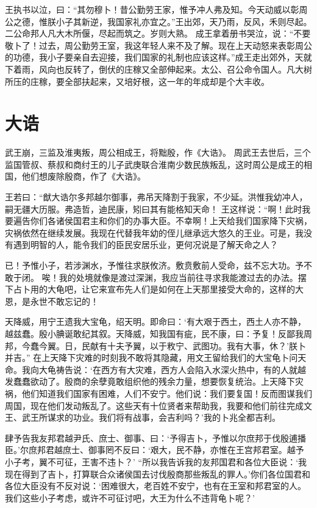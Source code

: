 \documentclass[12pt,UTF8]{ctexbook}
\begin{document}
王执书以泣，曰：“其勿穆卜！昔公勤劳王家，惟予冲人弗及知。今天动威以彰周公之德，惟朕小子其新逆，我国家礼亦宜之。”王出郊，天乃雨，反风，禾则尽起。二公命邦人凡大木所偃，尽起而筑之。岁则大熟。
成王拿着册书哭泣，说：“不要敬卜了！过去，周公勤劳王室，我这年轻人来不及了解。现在上天动怒来表彰周公的功德，我小子要亲自去迎接，我们国家的礼制也应该这样。”成王走出郊外，天就下着雨，风向也反转了，倒伏的庄稼又全部伸起来。太公、召公命令国人。凡大树所压的庄稼，要全部扶起来，又培好根，这一年的年成却是个大丰收。

\chapter{大诰}

武王崩，三监及淮夷叛，周公相成王，将黜殷，作《大诰》。
周武王去世后，三个监国管叔、蔡叔和商纣王的儿子武庚联合淮南少数民族叛乱，这时周公是成王的相国，他们想废除殷商，作了《大诰》。

王若曰：“猷大诰尔多邦越尔御事，弗吊天降割于我家，不少延。洪惟我幼冲人，嗣无疆大历服。弗造哲，迪民康，矧曰其有能格知天命！
王这样说：“啊！此时我要遍告你们各诸侯国君主和你们的办事大臣。不幸啊！上天给我们国家降下灾祸，灾祸依然在继续发展。我现在代替我年幼的侄儿继承远大悠久的王业。可是，我没有遇到明智的人，能令我们的臣民安居乐业，更何况说是了解天命之人？

已！予惟小子，若涉渊水，予惟往求朕攸济。敷贲敷前人受命，兹不忘大功。予不敢于闭。
唉！我的处境就像是渡过深渊，我应当前往寻求我能渡过去的办法。摆下占卜用的大龟吧，让它来宣布先人们是如何在上天那里接受大命的，这样的大恩，是永世不敢忘记的！

天降威，用宁王遗我大宝龟，绍天明。即命曰：‘有大艰于西土，西土人亦不静，越兹蠢。殷小腆诞敢纪其叙。天降威，知我国有疵，民不康，曰：予复！反鄙我周邦，今蠢今翼。日，民献有十夫予翼，以于敉宁、武图功。我有大事，休？’朕卜并吉。”
在上天降下灾难的时刻我不敢将其隐藏，用文王留给我们的大宝龟卜问天命。我向大龟祷告说：‘在西方有大灾难，西方人会陷入水深火热中，有的人就越发蠢蠢欲动了。殷商的余孽竟敢组织他的残余力量，想要恢复统治。上天降下灾祸，他们知道我们国家有困难，人们不安宁。他们说：我们要复国！反而图谋我们周国，现在他们发动叛乱了。这些天有十位贤者来帮助我，我要和他们前往完成文王、武王所谋求的功业。我们将有战事，会吉利吗？’我的卜兆全都吉利。

肆予告我友邦君越尹氏、庶士、御事、曰：‘予得吉卜，予惟以尔庶邦于伐殷逋播臣。’尔庶邦君越庶士、御事罔不反曰：‘艰大，民不静，亦惟在王宫邦君室。越予小子考，翼不可征，王害不违卜？’
“所以我告诉我的友邦国君和各位大臣说：‘我现在得到了吉卜，打算联合众诸侯国去讨伐殷商那些叛乱的罪人。’你们各位国君和各位大臣没有不反对说：‘困难很大，老百姓不安宁，也有在王室和邦君室的人。我们这些小子考虑，或许不可征讨吧，大王为什么不违背龟卜呢？’
\end{document}
